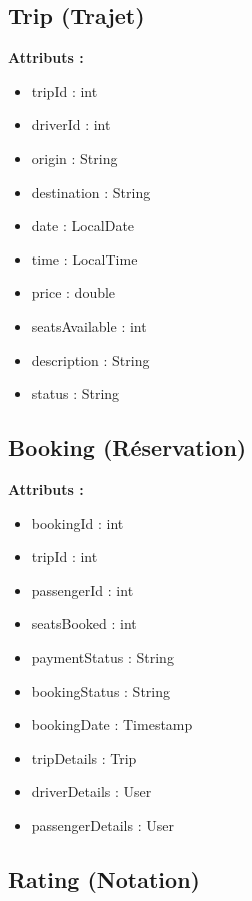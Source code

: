 \documentclass[12pt,a4paper]{report}
\begin{document}
\subsection{Trip (Trajet)}

\begin{tcolorbox}[colback=green!5,colframe=green!75!black,title=Classe Trip]
\textbf{Attributs :}
\begin{itemize}[noitemsep]
    \item tripId : int
    \item driverId : int
    \item origin : String
    \item destination : String
    \item date : LocalDate
    \item time : LocalTime
    \item price : double
    \item seatsAvailable : int
    \item description : String
    \item status : String
\end{itemize}
\end{tcolorbox}

\subsection{Booking (Réservation)}

\begin{tcolorbox}[colback=orange!5,colframe=orange!75!black,title=Classe Booking]
\textbf{Attributs :}
\begin{itemize}[noitemsep]
    \item bookingId : int
    \item tripId : int
    \item passengerId : int
    \item seatsBooked : int
    \item paymentStatus : String
    \item bookingStatus : String
    \item bookingDate : Timestamp
    \item tripDetails : Trip
    \item driverDetails : User
    \item passengerDetails : User
\end{itemize}
\end{tcolorbox}

\subsection{Rating (Notation)}
\end{document}

